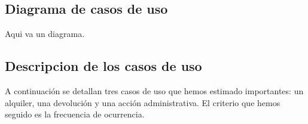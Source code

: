 \documentclass[11pt]{article}
\begin{document}
\subsection{Diagrama de casos de uso}
Aqui va un diagrama.


\subsection{Descripcion de los casos de uso}
A continuación se detallan tres casos de uso que hemos estimado importantes: un alquiler, una devolución y una acción administrativa. El criterio que hemos seguido es la frecuencia de ocurrencia.
\end{document}
